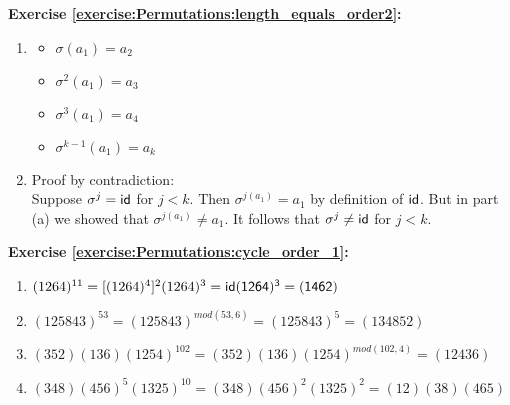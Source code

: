 \noindent\textbf{Exercise \ref{exercise:Permutations:length_equals_order2}:}
\begin{enumerate}[{a.}]
\item
	\begin{multicols}{3}
	\begin{itemize}
	\item
	$\sigma(a_1) = a_2$
	
	\item
	$\sigma^2(a_1) = a_3$
	
	\item
	$\sigma^3(a_1) = a_4$
	
	\item
	$\sigma^{k-1}(a_1) = a_k$
	\end{itemize}
	\end{multicols}
	
\item
Proof by contradiction:
\\
Suppose $\sigma^j = \sf{id}$ for $j < k$. Then $\sigma^{j(a_1)} = a_1$ by definition of $\sf{id}$. But in part (a) we showed that $\sigma^{j(a_1)} \neq a_1$.  It follows that $\sigma^j \neq \sf{id}$ for $j < k$. 
\end{enumerate}

\noindent\textbf{Exercise \ref{exercise:Permutations:cycle_order_1}:} %
\begin{enumerate}[{a.}]
\item
$(1264)^{11} = [(1264)^4]^2(1264)^3 = \sf{id}(1264)^3 = (1462)$

\item
$(125843)^{53} = (125843)^{mod(53,6)} = (125843)^5 = (134852)$

\item
$(352)(136)(1254)^{102} = (352)(136)(1254)^{mod(102,4)} = (12436)$

\item
$(348)(456)^5(1325)^{10} = (348)(456)^2(1325)^2 = (12)(38)(465)$
\end{enumerate}

